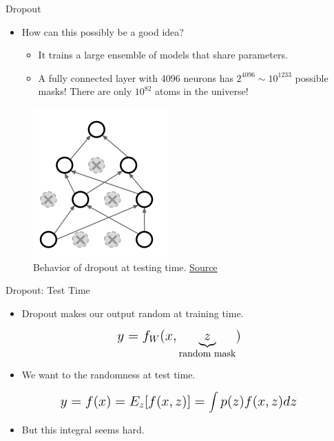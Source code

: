 \begin{frame}{Dropout}
	\begin{itemize}
		\item How can this possibly be a good idea?
		\begin{itemize}
			\item It trains a large ensemble of models that share parameters.
			\medskip
			\item A fully connected layer with 4096 neurons has $2^4096 \sim 10^1233$ possible masks! There are only $10^82$ atoms in the universe!
		\end{itemize}
	\end{itemize}
	\begin{figure}[H]
		\centering
		\includegraphics[height=0.4\textheight]{Figs/section_4/dropout_why2.png}
		\caption{Behavior of dropout at testing time. \href{https://www.cs.toronto.edu/~hinton/absps/JMLRdropout.pdf}{Source}}
	\end{figure}
\end{frame}
\begin{frame}{Dropout: Test Time}
	\begin{itemize}
		\item Dropout makes our output random at training time.
		\medskip
	\end{itemize}
	\begin{equation*}
		\mathlarger{\mathlarger{
		y = f_W(x, \underbrace{z}_{\text{random mask}})
	}}
	\end{equation*}
	\begin{itemize}
		\item We want to  the randomness at test time.
		\medskip
	\end{itemize}
	\begin{equation*}
		\mathlarger{\mathlarger{
			y = f(x) = E_z[f(x, z)] = \int p(z)f(x, z) dz
		}}
	\end{equation*}
	\begin{itemize}
		\item But this integral seems hard.
	\end{itemize}
\end{frame}
